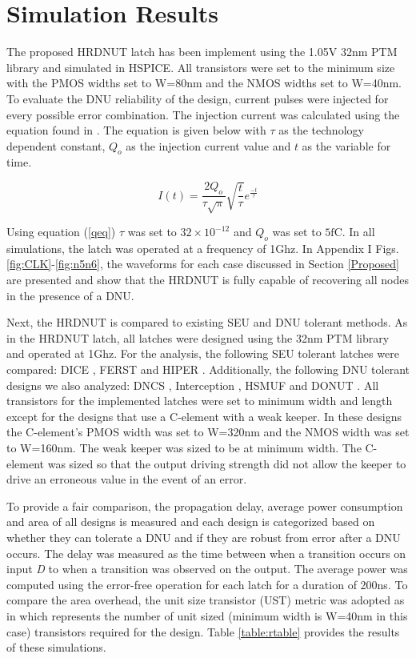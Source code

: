 \section{Simulation Results} \label{sec:res}
The proposed HRDNUT latch has been implement using the 1.05V 32nm PTM library \cite{PTM} and simulated in HSPICE. All transistors were set to the minimum size with the PMOS widths set to W=80nm and the NMOS widths set to W=40nm. To evaluate the DNU reliability of the design, current pulses were injected for every possible error combination. The injection current was calculated using the equation found in \cite{injeq}. The equation is given below with $\tau$ as the technology dependent constant, $Q_o$ as the injection current value and $t$ as the variable for time. 

\begin{equation}\label{qeq}
I(t)=\frac{2Q_o}{\tau\sqrt{\pi}}\sqrt{\frac{t}{\tau}}e^{\frac{-t}{\tau}}
\end{equation}

Using equation (\ref{qeq}) $\tau$ was set to $32\times10^{-12}$ and $Q_o$ was set to $5\text{fC}$. In all simulations, the latch was operated at a frequency of 1Ghz. In Appendix I Figs. \ref{fig:CLK}-\ref{fig:n5n6}, the waveforms for each case discussed in Section \ref{Proposed} are presented and show that the HRDNUT is fully capable of recovering all nodes in the presence of a DNU. 

Next, the HRDNUT is compared to existing SEU and DNU tolerant methods. As in the HRDNUT latch, all latches were designed using the 32nm PTM library and operated at 1Ghz. For the analysis, the following SEU tolerant latches were compared: DICE \cite{DICE}, FERST \cite{FERST} and HIPER \cite{HIPER}. Additionally, the following DNU tolerant designs we also analyzed: DNCS \cite{DNCS}, Interception \cite{Inter}, HSMUF \cite{HSMUF} and DONUT \cite{DONUT}. All transistors for the implemented latches were set to minimum width and length except for the designs that use a C-element with a weak keeper. In these designs the C-element's PMOS width was set to W=320nm and the NMOS width was set to W=160nm. The weak keeper was sized to be at minimum width. The C-element was sized so that the output driving strength did not allow the keeper to drive an erroneous value in the event of an error. 

To provide a fair comparison, the propagation delay, average power consumption and area of all designs is measured and each design is categorized based on whether they can tolerate a DNU and if they are robust from error after a DNU occurs. The delay was measured as the time between when a transition occurs on input \textit{D} to when a transition was observed on the output. The average power was computed using the error-free operation for each latch for a duration of 200ns. To compare the area overhead, the unit size transistor (UST) metric was adopted as in \cite{DNCS} which represents the number of unit sized (minimum width is W=40nm in this case) transistors required for the design. Table \ref{table:rtable} provides the results of these simulations.

